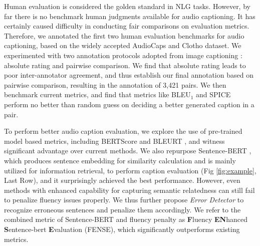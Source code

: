 \documentclass{article}
\begin{document}
Human evaluation is considered the golden standard in NLG tasks. However, by far there is no benchmark human judgments available for audio captioning.
It has certainly caused difficulty in conducting fair comparisons on evaluation metrics. 
Therefore, we annotated the first two human evaluation benchmarks for audio captioning, based on the widely accepted AudioCaps \cite{kim2019audiocaps} and Clotho \cite{drossos2020clotho} dataset. 
We experimented with two annotation protocols adopted from image captioning \cite{vedantam2015cider}: absolute rating and pairwise comparison. 
We find that absolute rating leads to poor inter-annotator agreement, and thus establish our final annotation based on pairwise comparison, resulting in the annotation of 3,421 pairs. 
We then benchmark current metrics, and find that metrics like BLEU$_1$ and SPICE perform no better than random guess on deciding a better generated caption in a pair.



To perform better audio caption evaluation, we explore the use of pre-trained model based metrics, including BERTScore \cite{zhang2019bertscore} and BLEURT \cite{sellam2020bleurt}, and witness significant advantage over current methods. 
We also repurpose Sentence-BERT \cite{reimers2019sentence}, which produces sentence embedding for similarity calculation and is mainly utilized for information retrieval, to perform caption evaluation (Fig \ref{fig:example}, Last Row), and it surprisingly achieved the best performance. 
However, even methods with enhanced capability for capturing semantic relatedness can still fail to penalize fluency issues properly.
We thus further propose \textit{Error Detector} to recognize erroneous sentences and penalize them accordingly. We refer to the combined metric of Sentence-BERT and fluency penalty as \textbf{F}luency \textbf{EN}hanced \textbf{S}entence-bert \textbf{E}valuation (FENSE), which significantly outperforms existing metrics.
\end{document}
